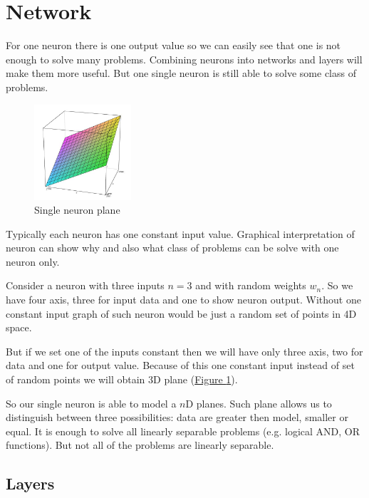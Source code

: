 \section{Network}

For one neuron there is one output value so we can easily see that one is not enough to solve many problems. Combining neurons into networks and layers will make them more useful. But one single neuron is still able to solve some class of problems.

\begin{figure}
    \includegraphics[width=0.32\textwidth]{Media/Plane.png}
    \caption{Single neuron plane}
    \label{fig:SingleNeuronPlane}
\end{figure}

Typically each neuron has one constant input value. Graphical interpretation of neuron can show why and also what class of problems can be solve with one neuron only.

Consider a neuron with three inputs $n = 3$ and with random weights $w_n$. So we have four axis, three for input data and one to show neuron output. Without one constant input graph of such neuron would be just a random set of points in 4D space.

But if we set one of the inputs constant then we will have only three axis, two for data and one for output value. Because of this one constant input instead of set of random points we will obtain 3D plane (\hyperref[fig:SingleNeuronPlane]{Figure \ref{fig:SingleNeuronPlane}}).

So our single neuron is able to model a $n$D planes. Such plane allows us to distinguish between three possibilities: data are greater then model, smaller or equal. It is enough to solve all linearly separable problems (e.g. logical AND, OR functions). But not all of the problems are linearly separable.


\subsection{Layers}

